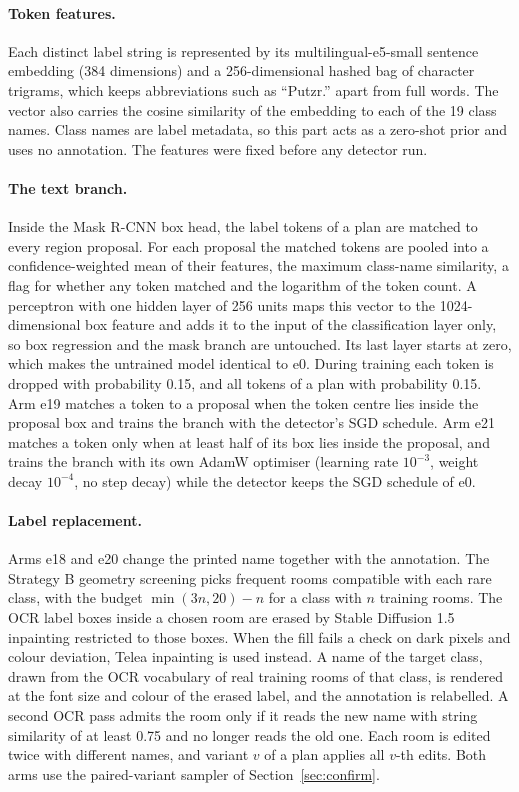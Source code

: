 \paragraph{Token features.} Each distinct label string is represented by its
multilingual-e5-small sentence embedding \cite{wang2024me5} (384 dimensions)
and a 256-dimensional hashed bag of character trigrams, which keeps
abbreviations such as ``Putzr.'' apart from full words. The vector also carries
the cosine similarity of the embedding to each of the 19 class names. Class
names are label metadata, so this part acts as a zero-shot prior and uses no
annotation. The features were fixed before any detector run.

\paragraph{The text branch.} Inside the Mask R-CNN box head, the label tokens
of a plan are matched to every region proposal. For each proposal the matched
tokens are pooled into a confidence-weighted mean of their features, the
maximum class-name similarity, a flag for whether any token matched and the
logarithm of the token count. A perceptron with one hidden layer of 256 units
maps this vector to the 1024-dimensional box feature and adds it to the input
of the classification layer only, so box regression and the mask branch are
untouched. Its last layer starts at zero, which makes the untrained model
identical to e0. During training each token is dropped with probability 0.15,
and all tokens of a plan with probability 0.15. Arm e19 matches a token to a
proposal when the token centre lies inside the proposal box and trains the
branch with the detector's SGD schedule. Arm e21 matches a token only when at
least half of its box lies inside the proposal, and trains the branch with its
own AdamW optimiser (learning rate $10^{-3}$, weight decay $10^{-4}$, no step
decay) while the detector keeps the SGD schedule of e0.

\paragraph{Label replacement.} Arms e18 and e20 change the printed name
together with the annotation. The Strategy B geometry screening picks frequent
rooms compatible with each rare class, with the budget $\min(3n, 20) - n$ for a
class with $n$ training rooms. The OCR label boxes inside a chosen room are
erased by Stable Diffusion 1.5 inpainting restricted to those boxes. When the
fill fails a check on dark pixels and colour deviation, Telea inpainting
\cite{telea2004inpainting} is used instead. A name of the target class, drawn
from the OCR vocabulary of real training rooms of that class, is rendered at
the font size and colour of the erased label, and the annotation is relabelled.
A second OCR pass admits the room only if it reads the new name with string
similarity of at least 0.75 and no longer reads the old one. Each room is
edited twice with different names, and variant $v$ of a plan applies all
$v$-th edits. Both arms use the paired-variant sampler of
Section~\ref{sec:confirm}.

